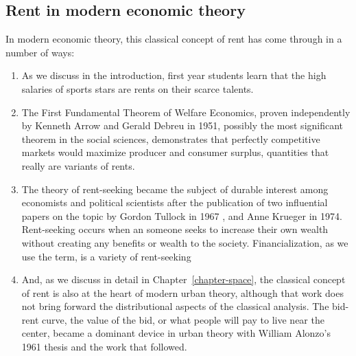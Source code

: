 \subsection{Rent in modern economic theory}
In modern economic theory, this classical concept of rent has come through in a number of ways: 
\begin{enumerate}

    \item As we discuss in the introduction, first year students learn that the high salaries of sports stars are rents on their scarce talents. 

    \item The First Fundamental Theorem of Welfare Economics, proven independently by Kenneth Arrow \cite{arrowExtensionBasicTheorems1951} and  Gerald Debreu \cite{debreuCoefficientResourceUtilization1951}  in 1951, possibly the most significant theorem in the social sciences, demonstrates that perfectly competitive markets would maximize producer and consumer surplus, quantities that really are variants of rents.

    \item The theory of \gls{rent-seeking}  became the subject of durable interest among economists and political scientists after the publication of two influential papers on the topic by Gordon Tullock in 1967 \cite{tullockWelfareCostsTariffs1967}, and Anne Krueger \cite{kruegerPoliticalEconomyRentSeeking1974} in 1974. Rent-seeking occurs when an someone seeks to increase their own wealth without creating any benefits or wealth to the society. Financialization, as we use the term, is a variety of rent-seeking
    
    \item And, as we discuss in detail in Chapter~\ref{chapter-space}, the classical concept of rent is also at the heart of modern urban theory, although that work does not bring forward the distributional aspects of the classical analysis. The \gls{bid-rent curve}, the value of the bid, or what people will pay to live near the center, became a dominant device  in urban theory with William Alonzo's 1961 thesis \cite{alonzoTheoryUrbanLand1960} and the work that followed. %
\end{enumerate}
